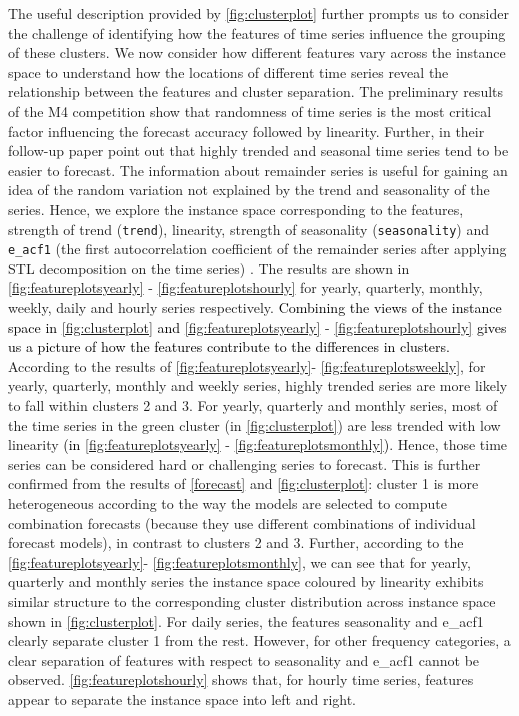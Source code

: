 \documentclass[11pt,a4paper,]{article}
\begin{document}
The useful description provided by \autoref{fig:clusterplot} further prompts us to consider the challenge of identifying how the features of time series influence the grouping of these clusters. We now consider how different features vary across the instance space to understand how the locations of different time series reveal the relationship between the features and cluster separation. The preliminary results of the M4 competition \autocite{makridakis2018m4} show that randomness of time series is the most critical factor influencing the forecast accuracy followed by linearity. Further, in their follow-up paper \textcite{spiliotis2019forecasting} point out that highly trended and seasonal time series tend to be easier to forecast. The information about remainder series is useful for gaining an idea of the random variation not explained by the trend and seasonality of the series. Hence, we explore the instance space corresponding to the features, strength of trend (\texttt{trend}), linearity, strength of seasonality (\texttt{seasonality}) and \texttt{e\_acf1} (the first autocorrelation coefficient of the remainder series after applying STL decomposition on the time series) \autocite{cleveland1990stl}. The results are shown in \autoref{fig:featureplotsyearly} - \autoref{fig:featureplotshourly} for yearly, quarterly, monthly, weekly, daily and hourly series respectively. \textcolor{black}{Combining the views of the instance space in} \autoref{fig:clusterplot} \textcolor{black}{and} \autoref{fig:featureplotsyearly} - \autoref{fig:featureplotshourly} \textcolor{black}{gives us a picture of how the features contribute to the differences in clusters.} According to the results of \autoref{fig:featureplotsyearly}- \autoref{fig:featureplotsweekly}, for yearly, quarterly, monthly and weekly series, highly trended series are more likely to fall within clusters 2 and 3. For yearly, quarterly and monthly series, most of the time series in the green cluster (in \autoref{fig:clusterplot}) are less trended with low linearity \textcolor{black}{(in} \autoref{fig:featureplotsyearly} - \autoref{fig:featureplotsmonthly}\textcolor{black}{)}. Hence, those time series can be considered hard or challenging series to forecast. This is further confirmed from the results of \autoref{forecast} and \autoref{fig:clusterplot}: cluster 1 is more heterogeneous according to the way the models are selected to compute combination forecasts (because they use different combinations of individual forecast models), in contrast to clusters 2 and 3. Further, according to the \autoref{fig:featureplotsyearly}- \autoref{fig:featureplotsmonthly}, we can see that for yearly, quarterly and monthly series the instance space coloured by linearity exhibits similar structure to the corresponding cluster distribution across instance space shown in \autoref{fig:clusterplot}. For daily series, the features seasonality and e\_acf1 clearly separate cluster 1 from the rest. However, for other frequency categories, a clear separation of features with respect to seasonality and e\_acf1 cannot be observed. \autoref{fig:featureplotshourly} shows that, for hourly time series, features appear to separate the instance space into left and right.
\end{document}
